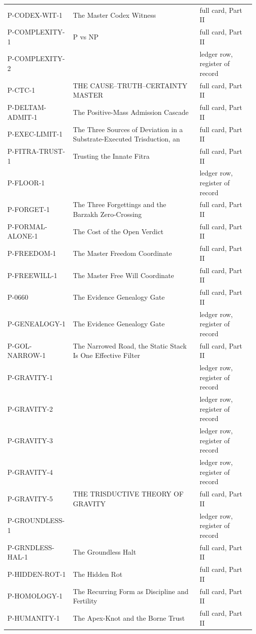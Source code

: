 \documentclass[10pt,twocolumn]{article}
\begin{document}
\begin{center}
\begin{longtable}{>{\raggedright\arraybackslash}p{}>{\raggedright\arraybackslash}p{}>{\raggedright\arraybackslash}p{}}
P-CODEX-WIT-1 & The Master Codex Witness & full card, Part II \\
P-COMPLEXITY-1 & P vs NP & full card, Part II \\
P-COMPLEXITY-2 &  & ledger row, register of record \\
P-CTC-1 & THE CAUSE–TRUTH–CERTAINTY MASTER & full card, Part II \\
P-DELTAM-ADMIT-1 & The Positive-Mass Admission Cascade & full card, Part II \\
P-EXEC-LIMIT-1 & The Three Sources of Deviation in a Substrate-Executed Trisduction, an & full card, Part II \\
P-FITRA-TRUST-1 & Trusting the Innate Fitra & full card, Part II \\
P-FLOOR-1 &  & ledger row, register of record \\
P-FORGET-1 & The Three Forgettings and the Barzakh Zero-Crossing & full card, Part II \\
P-FORMAL-ALONE-1 & The Cost of the Open Verdict & full card, Part II \\
P-FREEDOM-1 & The Master Freedom Coordinate & full card, Part II \\
P-FREEWILL-1 & The Master Free Will Coordinate & full card, Part II \\
P-0660 & The Evidence Genealogy Gate & full card, Part II \\
P-GENEALOGY-1 & The Evidence Genealogy Gate & ledger row, register of record \\
P-GOL-NARROW-1 & The Narrowed Road, the Static Stack Is One Effective Filter & full card, Part II \\
P-GRAVITY-1 &  & ledger row, register of record \\
P-GRAVITY-2 &  & ledger row, register of record \\
P-GRAVITY-3 &  & ledger row, register of record \\
P-GRAVITY-4 &  & ledger row, register of record \\
P-GRAVITY-5 & THE TRISDUCTIVE THEORY OF GRAVITY & full card, Part II \\
P-GROUNDLESS-1 &  & ledger row, register of record \\
P-GRNDLESS-HAL-1 & The Groundless Halt & full card, Part II \\
P-HIDDEN-ROT-1 & The Hidden Rot & full card, Part II \\
P-HOMOLOGY-1 & The Recurring Form as Discipline and Fertility & full card, Part II \\
P-HUMANITY-1 & The Apex-Knot and the Borne Trust & full card, Part II \\

\end{longtable}
\end{center}
\end{document}
